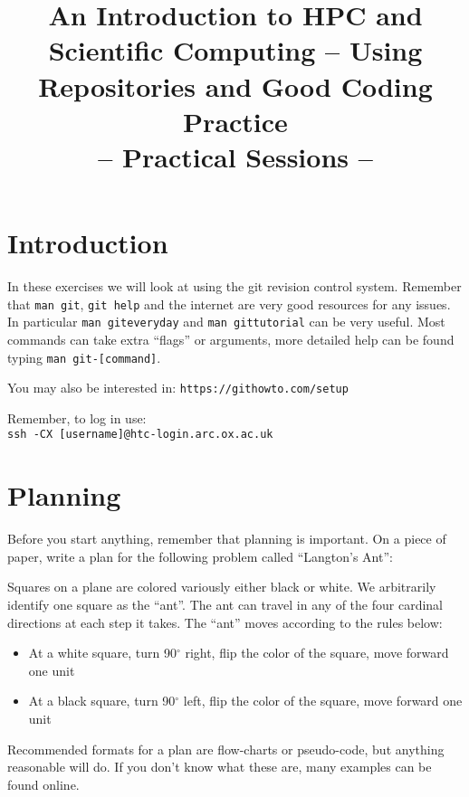 \documentclass[a4paper, 12pt]{article}
\title{{\Huge\bf An Introduction to HPC and Scientific Computing -- Using Repositories and Good Coding Practice\footnotetext{Thanks to Jacob Wilkins and Ian Bush for materials.}} \\ {\huge -- Practical Sessions --}}
\date{}
\def \cc   {\tt }               %
\begin{document}
\maketitle

\vfill

\tableofcontents

\newpage


\section{Introduction}
\label{Introduction}

In these exercises we will look at using the git revision control system. Remember that {\cc man git}, {\cc git help} and the internet are very good resources for any issues. In particular {\cc man giteveryday} and {\cc man gittutorial} can be very useful. Most commands can take extra ``flags'' or arguments, more detailed help can be found typing {\cc man git-[command]}.

You may also be interested in: {\cc https://githowto.com/setup}


Remember, to log in use: \\
{\cc ssh -CX [username]@htc-login.arc.ox.ac.uk}



\section{Planning}
Before you start anything, remember that planning is important. On a piece of paper, write a plan for the following problem called ``Langton's Ant'':

Squares on a plane are colored variously either black or white. We arbitrarily identify one square as the ``ant''. The ant can travel in any of the four cardinal directions at each step it takes. The ``ant'' moves according to the rules below:

\begin{itemize}
    \item{} At a white square, turn 90$^{\circ}$ right, flip the color of the square, move forward one unit
    \item{} At a black square, turn 90$^{\circ}$ left, flip the color of the square, move forward one unit
\end{itemize}

Recommended formats for a plan are flow-charts or pseudo-code, but anything reasonable will do. If you don't know what these are, many examples can be found online.
\end{document}
